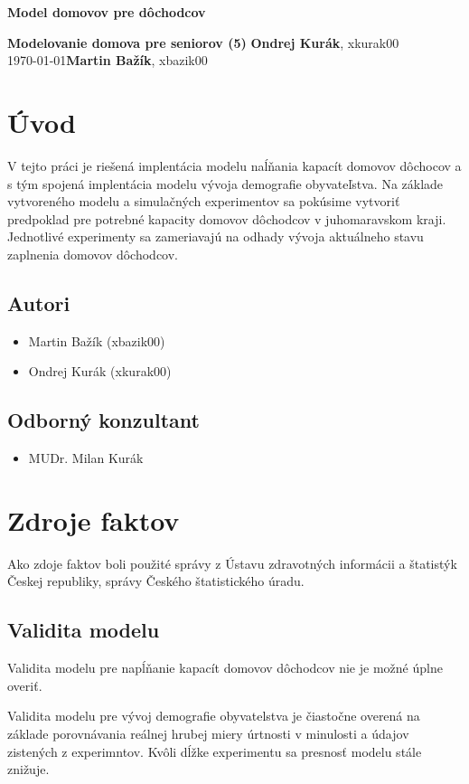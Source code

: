 \documentclass[a4paper, 11pt]{article}
\begin{document}
    \begin{center}
    \Large \textbf{Model domovov pre dôchodcov}
    \end{center}
    \noindent
    \large\textbf{Modelovanie domova pre seniorov (5)} \hfill \textbf{Ondrej Kurák}, xkurak00 \\
    \today \hfill \textbf{Martin Bažík}, xbazik00 \\
    
    
    \section{Úvod}
    V tejto práci je riešená implentácia modelu naĺňania kapacít domovov dôchocov a s tým spojená implentácia modelu vývoja demografie obyvateľstva. Na základe vytvoreného modelu a simulačných experimentov sa pokúsime vytvoriť predpoklad pre potrebné kapacity domovov dôchodcov v juhomaravskom kraji. Jednotlivé experimenty sa zameriavajú na odhady vývoja aktuálneho stavu zaplnenia domovov dôchodcov.
    \subsection{Autori}
    \begin{itemize}
    \item Martin Bažík (xbazik00)
    \item Ondrej Kurák (xkurak00)
    \end{itemize}
    \subsection{Odborný konzultant}
    \begin{itemize}
    \item MUDr. Milan Kurák
    \end{itemize}
    \section{Zdroje faktov}
    Ako zdoje faktov boli použité správy z Ústavu zdravotných informácii a štatistýk Českej republiky, správy Českého štatistického úradu. 
    \subsection{Validita modelu}
    Validita modelu pre napĺňanie kapacít domovov dôchodcov nie je možné úplne overiť.
    
    Validita modelu pre vývoj demografie obyvatelstva je čiastočne overená na základe porovnávania reálnej hrubej miery úrtnosti v minulosti a údajov zistených z experimntov. Kvôli dĺžke experimentu sa presnosť modelu stále znižuje.
    
\end{document}
